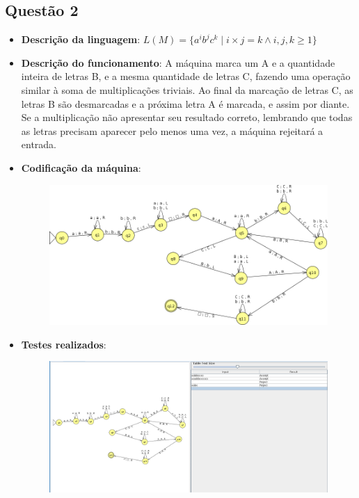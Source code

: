 \documentclass{article}
\begin{document}
\subsection*{Questão 2}
\begin{itemize}

    \item \textbf{Descrição da linguagem}:
        $L(M) = \{a^{i}b^{j}c^{k} \mid i \times j = k \land i,j,k \geq 1\}$

    \item \textbf{Descrição do funcionamento}: A máquina marca um A e a
        quantidade inteira de letras B, e a mesma quantidade de letras C,
        fazendo uma operação similar à soma de multiplicações triviais. Ao
        final da marcação de letras C, as letras B são desmarcadas e a próxima
        letra A é marcada, e assim por diante. Se a multiplicação não
        apresentar seu resultado correto, lembrando que todas as letras
        precisam aparecer pelo menos uma vez, a máquina rejeitará a entrada.

    \item \textbf{Codificação da máquina}:

        \begin{figure}[htbp]
            \centering
            \includegraphics[scale=0.5]{images/questao2_ss.png}
        \end{figure}

	\item \textbf{Testes realizados}:

        \begin{figure}[htbp]
            \centering
            \includegraphics[width=\textwidth]{images/questao2_inputs.png}
        \end{figure}

\end{itemize}
\end{document}
